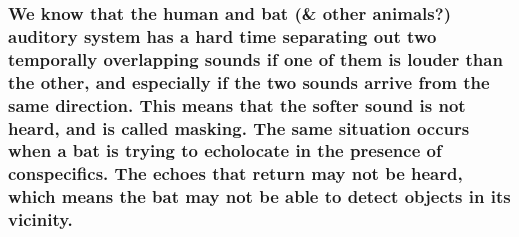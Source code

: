\documentclass[11pt]{article}
\begin{document}
    \hypertarget{we-know-that-the-human-and-bat-other-animals-auditory-system-has-a-hard-time-separating-out-two-temporally-overlapping-sounds-if-one-of-them-is-louder-than-the-other-and-especially-if-the-two-sounds-arrive-from-the-same-direction.-this-means-that-the-softer-sound-is-not-heard-and-is-called-masking.-the-same-situation-occurs-when-a-bat-is-trying-to-echolocate-in-the-presence-of-conspecifics.-the-echoes-that-return-may-not-be-heard-which-means-the-bat-may-not-be-able-to-detect-objects-in-its-vicinity.}{%
\subsubsection{We know that the human and bat (\& other animals?)
auditory system has a hard time separating out two temporally
overlapping sounds if one of them is louder than the other, and
especially if the two sounds arrive from the same direction. This means
that the softer sound is not heard, and is called masking. The same
situation occurs when a bat is trying to echolocate in the presence of
conspecifics. The echoes that return may not be heard, which means the
bat may not be able to detect objects in its
vicinity.}\label{we-know-that-the-human-and-bat-other-animals-auditory-system-has-a-hard-time-separating-out-two-temporally-overlapping-sounds-if-one-of-them-is-louder-than-the-other-and-especially-if-the-two-sounds-arrive-from-the-same-direction.-this-means-that-the-softer-sound-is-not-heard-and-is-called-masking.-the-same-situation-occurs-when-a-bat-is-trying-to-echolocate-in-the-presence-of-conspecifics.-the-echoes-that-return-may-not-be-heard-which-means-the-bat-may-not-be-able-to-detect-objects-in-its-vicinity.}}
\end{document}
